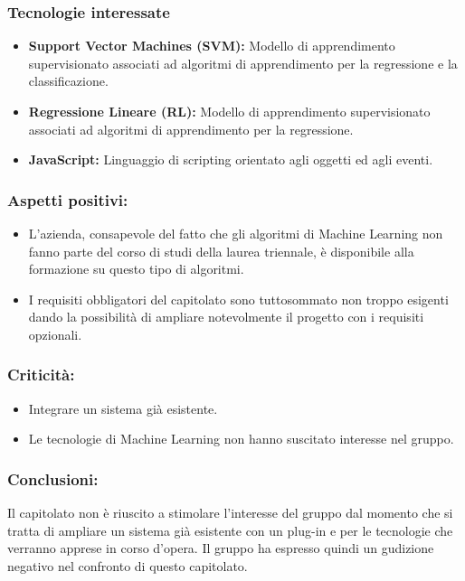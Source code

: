 		\subsubsection{Tecnologie interessate}
			\begin{itemize}
			  \item \textbf{Support Vector Machines (SVM):} Modello di apprendimento supervisionato associati ad algoritmi di apprendimento per la regressione e la classificazione.
			  \item \textbf{Regressione Lineare (RL):} Modello di apprendimento supervisionato associati ad algoritmi di apprendimento per la regressione.
			  \item \textbf{JavaScript:} Linguaggio di scripting orientato agli oggetti ed agli eventi.
			\end{itemize}
		
		\subsubsection{Aspetti positivi:}
			\begin{itemize}
			  \item L'azienda, consapevole del fatto che gli algoritmi di Machine Learning non fanno parte del corso di studi della laurea triennale, è disponibile alla formazione su questo tipo di algoritmi.
			  \item I requisiti obbligatori del capitolato sono tuttosommato non troppo esigenti dando la possibilità di ampliare notevolmente il progetto con i requisiti opzionali.
			\end{itemize}
			
		\subsubsection{Criticità:}
			\begin{itemize}
			  \item Integrare un sistema già esistente.
			  \item Le tecnologie di Machine Learning non hanno suscitato interesse nel gruppo.
			\end{itemize}
		
		\subsubsection{Conclusioni:}
			Il capitolato non è riuscito a stimolare l'interesse del gruppo dal momento che si tratta di ampliare un sistema già esistente con un plug-in e per le tecnologie che verranno apprese in corso d'opera.
			Il gruppo ha espresso quindi un gudizione negativo nel confronto di questo capitolato.